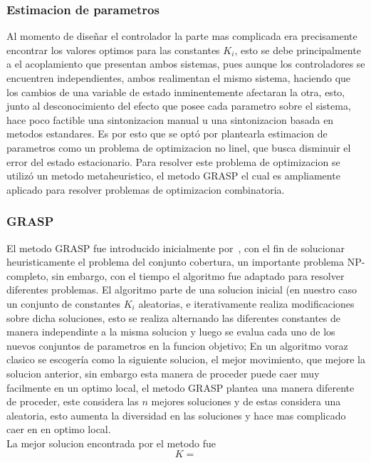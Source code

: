 \subsubsection{Estimacion de parametros}
Al momento de diseñar el controlador la parte mas complicada era precisamente encontrar los
valores optimos para las constantes $K_i$, esto se debe principalmente a el acoplamiento que
presentan ambos sistemas, pues aunque los controladores se encuentren independientes, ambos
realimentan el mismo sistema, haciendo que los cambios de una variable de estado
inminentemente afectaran la otra, esto, junto al desconocimiento del efecto que posee cada
parametro sobre el sistema, hace poco factible una sintonizacion manual u una sintonizacion
basada en metodos estandares. Es por esto que se optó por plantearla estimacion de parametros
como un problema de optimizacion no linel, que busca disminuir el error del estado
estacionario.
Para resolver este problema de optimizacion se utilizó un metodo metaheuristico, el metodo
GRASP el cual es ampliamente aplicado para resolver problemas de optimizacion combinatoria.
\subsubsection{GRASP}
El metodo GRASP fue introducido inicialmente por~\citet{Feo1989}, con el fin de solucionar
heuristicamente el problema del conjunto cobertura, un importante problema NP-completo,
sin embargo, con el tiempo el algoritmo fue adaptado para resolver diferentes problemas.
El algoritmo parte de una solucion inicial (en nuestro caso un conjunto de constantes $K_i$
aleatorias, e iterativamente realiza modificaciones sobre dicha soluciones, esto se realiza
alternando las diferentes constantes de manera independinte a la misma solucion y luego se
evalua cada uno de los nuevos conjuntos de parametros en la funcion objetivo; En un algoritmo
voraz clasico se escogería como la siguiente solucion, el mejor movimiento, que mejore la solucion
anterior, sin embargo esta manera de proceder puede caer muy facilmente en un optimo local, el metodo
GRASP plantea una manera diferente de proceder, este considera las $n$ mejores soluciones y de estas
considera una aleatoria, esto aumenta la diversidad en las soluciones y hace mas complicado caer en
en optimo local.\\
La mejor solucion encontrada por el metodo fue
\[K = \]


